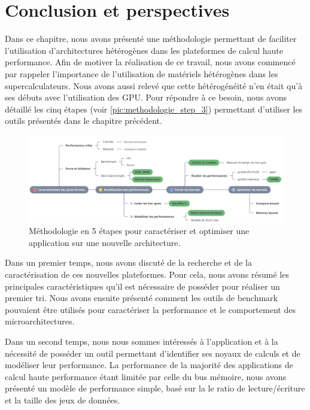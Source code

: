 \section{Conclusion et perspectives}\label{sec:methodo_conclusion}

    
    Dans ce chapitre, nous avons présenté une méthodologie permettant de faciliter l'utilisation d'architectures hétérogènes dans les plateformes de calcul haute performance. Afin de motiver la réalisation de ce travail, nous avons commencé par rappeler l'importance de l'utilisation de matériels hétérogènes dans les supercalculateurs. Nous avons aussi relevé que cette hétérogénéité n'en était qu'à ses débuts avec l'utilisation des GPU. Pour répondre à ce besoin, nous avons détaillé les cinq étapes (voir \autoref{pic:methodologie_step_3}) permettant d'utiliser les outils présentés dans le chapitre précédent.
    
    \begin{figure}[h!]
    \center
    \includegraphics[width=17cm]{images/methodologie_step.png}
    \caption{\label{pic:methodologie_step_3} Méthodologie en 5 étapes pour caractériser et optimiser une application sur une nouvelle architecture.}    \end{figure}
    
    
    Dans un premier temps, nous avons discuté de la recherche et de la caractérisation de ces nouvelles plateformes. Pour cela, nous avons résumé les principales caractéristiques qu'il est nécessaire de posséder pour réaliser un premier tri. Nous avons ensuite présenté comment les outils de benchmark pouvaient être utilisés pour caractériser la performance et le comportement des microarchitectures.
    
    Dans un second temps, nous nous sommes intéressés à l'application et à la nécessité de posséder un outil permettant d'identifier ses noyaux de calculs et de modéliser leur performance. La performance de la majorité des applications de calcul haute performance étant limitée par celle du bus mémoire, nous avons présenté un modèle de performance simple, basé sur la le ratio de lecture/écriture et la taille des jeux de données. 
    
